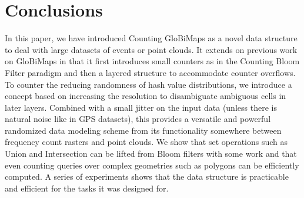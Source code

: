 \documentclass[sigconf, nonacm]{acmart}
\begin{document}

\section{Conclusions}\label{conclusion}
\balance
In this paper, we have introduced Counting GloBiMaps as a novel data structure to deal with large datasets of events or point clouds. It extends on previous work on GloBiMaps in that it first introduces small counters as in the Counting Bloom Filter paradigm and then a layered structure to accommodate counter overflows. To counter the reducing randomness of hash value distributions, we introduce a concept based on increasing the resolution to disambiguate ambiguous cells in later layers. Combined with a small jitter on the input data (unless there is natural noise like in GPS datasets), this provides a versatile and powerful randomized data modeling scheme from its functionality somewhere between frequency count rasters and point clouds. We show that set operations such as Union and Intersection can be lifted from Bloom filters with some work and that even counting queries over complex geometries such as polygons can be efficiently computed. A series of experiments shows that the data structure is practicable and efficient for the tasks it was designed for.



\balance


\end{document}
